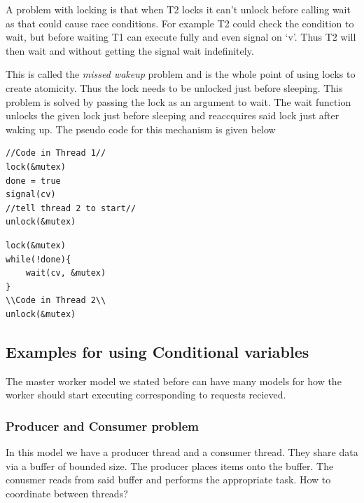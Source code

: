 \documentclass[12pt]{article}
\newcommand{\tbox}[1]{\noindent\fbox{\parbox{\textwidth}{#1}}}
\begin{document}
A problem with locking is that when T2 locks it can't unlock before calling wait as that could cause race conditions. For example T2 could check the condition to wait, but before waiting T1 can execute fully and even signal on `v'. Thus T2 will then wait and without getting the signal wait indefinitely.

This is called the \textit{missed wakeup} problem and is the whole point of using locks to create atomicity. Thus the lock needs to be unlocked just before sleeping. This problem is solved by passing the lock as an argument to wait. The wait function unlocks the given lock 
just before sleeping and reaccquires said lock just after waking up. The pseudo code for this mechanism is given below
\begin{multicols}{2}
\begin{tcolorbox}[colback=red!5!white,colframe=red!75!black]
\begin{verbatim}
//Code in Thread 1//
lock(&mutex)
done = true
signal(cv)
//tell thread 2 to start//
unlock(&mutex)
\end{verbatim}
\end{tcolorbox}

\begin{tcolorbox}[colback=blue!5!white,colframe=blue!75!black]
\begin{verbatim}
lock(&mutex)
while(!done){
    wait(cv, &mutex)
}
\\Code in Thread 2\\
unlock(&mutex)
\end{verbatim}
\end{tcolorbox}
\end{multicols}

\newpage
\noindent\tbox{
    \begin{center}
    \textbf{\Huge Lecture 25}
    \end{center}
}
\subsection{Examples for using Conditional variables}
The master worker model we stated before can have many models for how the worker should start executing corresponding to requests recieved. 
\subsubsection{Producer and Consumer problem}
In this model we have a producer thread and a consumer thread. They share data via a buffer of bounded size. The producer places items onto the buffer. The conusmer 
reads from said buffer and performs the appropriate task. How to coordinate between threads?
\end{document}
